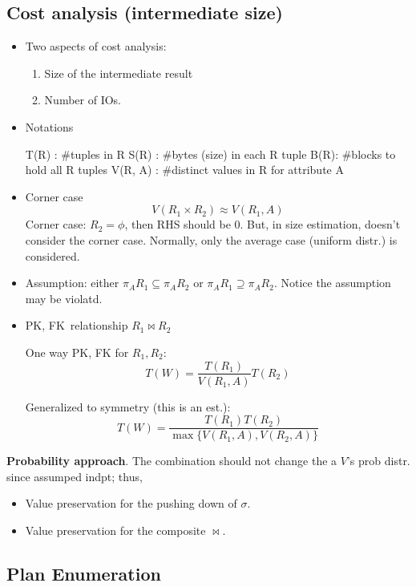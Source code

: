 \documentclass[a4paper]{report}
\begin{document}
\subsection{Cost analysis (intermediate size)}
\begin{itemize}
\item Two aspects of cost analysis:
\begin{enumerate}
\item Size of the intermediate result 
\item Number of IOs.
\end{enumerate}
\item Notations
\begin{enumerate}
\treeitem T(R) : #tuples in R
\treeitem S(R) : #bytes (size) in each R tuple
\treeitem B(R): #blocks to hold all R tuples 
\treeitem V(R, A) : #distinct values in R for attribute A
\end{enumerate}
\item Corner case 
$$
V(R_1\times R_2) \approx V(R_1, A)
$$
Corner case: $R_2=\phi$, then RHS should be 0. But, in size estimation, doesn't consider the corner case. Normally, only the average case (uniform distr.) is considered. 
\end{itemize}
\begin{itemize}
\item Assumption: either $\pi_{A}R_1 \subseteq \pi_{A}R_2$ or $\pi_{A}R_1 \supseteq \pi_{A}R_2$.
Notice the assumption may be violatd. 
\item \textbraceleft PK, FK\textbraceright\ relationship $R_1\bowtie R_2$

One way PK, FK for $R_1, R_2$: 
$$
T(W) = \frac{T(R_1)}{V(R_1, A)} T(R_2)
$$

Generalized to symmetry (this is an est.): 
$$
T(W) = \frac{T(R_1)T(R_2)}{\max\{V(R_1, A), V(R_2, A)\}}
$$
\end{itemize}

\textbf{Probability approach}. The combination should not change the a $V$'s prob distr. since assumped indpt; thus,\begin{itemize}
\item Value preservation for the pushing down of $\sigma$. 
\item Value preservation for the composite $\bowtie$. 
\end{itemize}
\subsection{Plan Enumeration}
\end{document}
